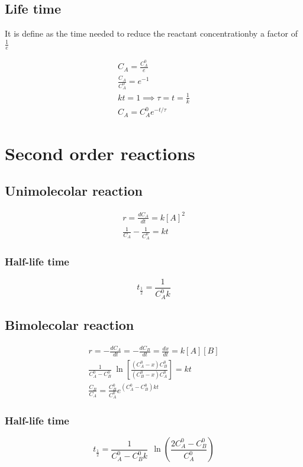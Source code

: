 \documentclass[../Master.tex]{subfiles}
\begin{document}
\begin{multicols*}{2}
	\subsection{Life time}
	It is define as the time needed to reduce the reactant concentrationby a factor of \( \frac{1}{e} \)

	\begin{gather*}
		C_{A}= \frac{C_A^0}{e}\\
		\frac{C_{A}}{C_{A}^0} = e^{-1}\\
		kt = 1 \implies \tau = t = \frac{1}{k} \\
		C_{A} = C_{A}^{0} e^{- t / \tau }
	\end{gather*}

	\section{Second order reactions}
	\subsection{Unimolecolar reaction}
	\begin{gather*}
		r = \frac{dC_{A}}{dt} = k[A]^{2} \\
		\frac{1}{C_{A} } - \frac{1}{C_{A} ^{0}} = kt
	\end{gather*}
	\subsubsection{Half-life time}
	\[
		t_{\frac{1}{2}} = \frac{1}{C_{A} ^{0}k}
	\]

	\subsection{Bimolecolar reaction}
	\begin{gather*}
		r = - \frac{dC_{A}}{dt} = - \frac{dC_{B}}{dt} = \frac{dx}{dt} = k[A][B] \\
		\frac{1}{C_{A} ^{0} - C_{B} ^{0} }~\ln\left[\frac{(C_{A} ^{0} - x)C_{B} ^{0} }{(C_{B} ^{0} - x) C_{A} ^{0} }\right] = kt\\
		\frac{C_{B}}{C_{A}} = \frac{C_{B} ^{0} }{C_{A} ^{0} }e^{(C_{A} ^{0}-C_{B} ^{0}  )kt}
	\end{gather*}

	\subsubsection{Half-life time}
	\[
		t_{\frac{1}{2}} = \frac{1}{C_{A} ^{0} - C_{B} ^{0} k}~ ~  \ln\left(  \frac{2C_{A} ^{0} - C_{B}^{0} }{C_{A}^{0}} \right)
	\]


\end{multicols*}
\end{document}
